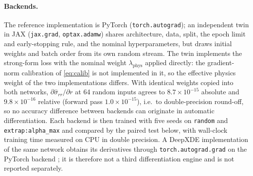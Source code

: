 \documentclass[subscriptcorrection,upint,varvw,barcolor=Goldenrod3,mathalfa=cal=euler,balance,hyphenate,french,pdf-a]{asmejour} %
\begin{document}
\paragraph{Backends.}
The reference implementation is PyTorch (\texttt{torch.autograd}); an independent
twin in JAX (\texttt{jax.grad}, \texttt{optax.adamw}) shares architecture, data,
split, the epoch limit and early-stopping rule, and the nominal hyperparameters,
but draws initial weights and batch order from its own random stream.
The twin implements the strong-form loss with the nominal weight
$\lambda_{\mathrm{phys}}$ applied directly: the gradient-norm calibration of
\eqref{eq:calib} is not implemented in it, so the effective physics weight of the
two implementations differs.
With identical weights copied into both networks, $\partial\hat\sigma_{rr}/\partial r$
at 64 random inputs agrees to $8.7\times10^{-15}$ absolute and $9.8\times10^{-16}$
relative (forward pass $1.0\times10^{-15}$), i.e.\ to double-precision round-off,
so no accuracy difference between backends can originate in automatic
differentiation.
Each backend is then trained with five seeds on \texttt{random} and
\texttt{extrap:alpha\_max} and compared by the paired test below, with wall-clock
training time measured on CPU in double precision.
A DeepXDE implementation of the same network obtains its derivatives through
\texttt{torch.autograd.grad} on the PyTorch backend \citep{lu2021}; it is therefore not a third
differentiation engine and is not reported separately.
\end{document}
